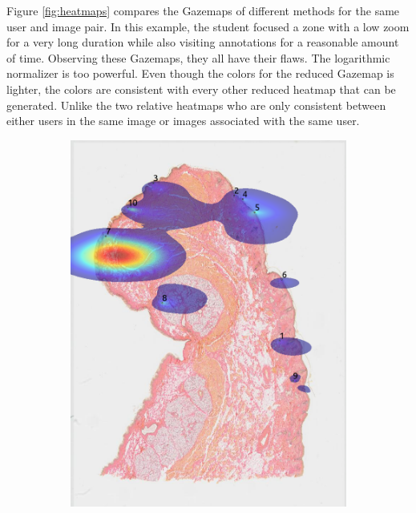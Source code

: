 \documentclass[a4paper,11pt]{report}
\numberwithin{figure}{chapter} %
\begin{document}
\begin{itemize}
\begin{itemize}
        \end{itemize}
        Figure \ref{fig:heatmaps} compares the Gazemaps of different methods for the same user and image pair.
        In this example, the student focused a zone with a low zoom for a very long duration while also visiting annotations for a reasonable amount of time.
        Observing these Gazemaps, they all have their flaws.
        The logarithmic normalizer is too powerful.
        Even though the colors for the reduced Gazemap is lighter, the colors are consistent with every other reduced heatmap that can be generated.
        Unlike the two relative heatmaps who are only consistent between either users in the same image or images associated with the same user.

        \begin{figure}[H]
            \centering
            \begin{subfigure}[b]{0.19\textwidth}
            \includegraphics[width=\textwidth]{images/5501147_heatmap_basic.png}

\end{subfigure}
\end{figure}
\end{itemize}
\end{document}
